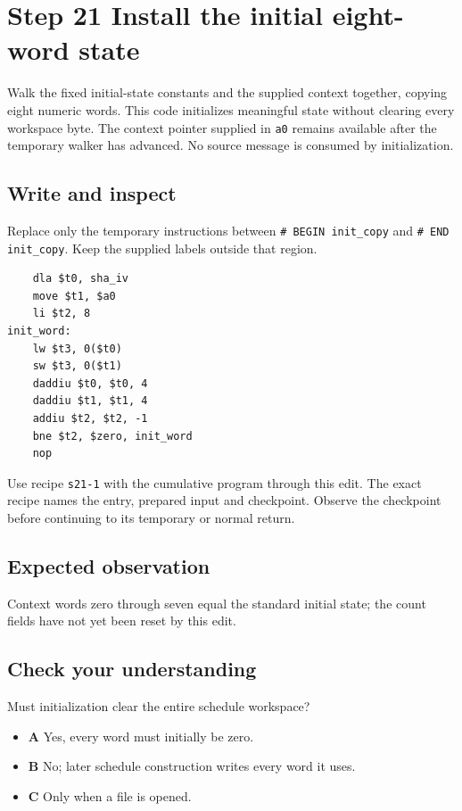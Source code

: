 \section{Step 21 Install the initial eight-word state}\label{sha-s21}

Walk the fixed initial-state constants and the supplied context together, copying eight numeric words. This code initializes meaningful state without clearing every workspace byte. The context pointer supplied in \texttt{a0} remains available after the temporary walker has advanced. No source message is consumed by initialization.

\subsection{Write and inspect}
Replace only the temporary instructions between \texttt{\# BEGIN init\_copy} and \texttt{\# END init\_copy}. Keep the supplied labels outside that region.

\begin{verbatim}
    dla $t0, sha_iv
    move $t1, $a0
    li $t2, 8
init_word:
    lw $t3, 0($t0)
    sw $t3, 0($t1)
    daddiu $t0, $t0, 4
    daddiu $t1, $t1, 4
    addiu $t2, $t2, -1
    bne $t2, $zero, init_word
    nop
\end{verbatim}

Use recipe \texttt{s21-1} with the cumulative program through this edit. The exact recipe names the entry, prepared input and checkpoint. Observe the checkpoint before continuing to its temporary or normal return.

\subsection{Expected observation}
Context words zero through seven equal the standard initial state; the count fields have not yet been reset by this edit.

\subsection{Check your understanding}
Must initialization clear the entire schedule workspace?

\begin{itemize}
\item \textbf{A} Yes, every word must initially be zero.
\item \textbf{B} No; later schedule construction writes every word it uses.
\item \textbf{C} Only when a file is opened.
\end{itemize}
